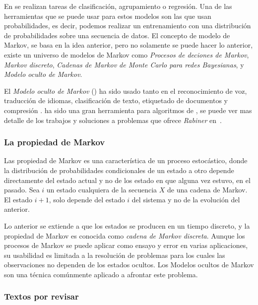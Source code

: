 
En \machinelearning se realizan tareas de clasificación, agrupamiento o regresión. Una de las herramientas que se puede usar para estos modelos son las que usan probabilidades, es decir, podemos realizar un entrenamiento con una distribución de probabilidades sobre una secuencia de datos. El concepto de modelo de Markov, se basa en la idea anterior, pero no solamente se puede hacer lo anterior, existe un universo de modelos de Markov como \emph{Procesos de deciones de Markov}, \emph{Markov discreto}, \emph{Cadenas de Markov de Monte Carlo para redes Bayesianas}, y  \emph{Modelo oculto de Markov}.

El \emph{Modelo oculto de Markov} (\HMM) ha sido usado tanto en el reconocimiento de voz, traducción de idiomas, clasificación de texto, etiquetado de documentos y compresión \MLkhanna. \HMM ha sido una gran herramienta para algoritmos de \machinelearning, se puede ver mas detalle de los trabajos y soluciones a problemas que ofrece \emph{Rabiner} en~\cite{}.





\subsubsection{La propiedad de Markov}



Las propiedad de Markov es una característica de un proceso estocástico, donde la distribución de probabilidades condicionales de un estado a otro depende directamente del estado actual y no de los estado en que alguna vez estuvo, en el pasado. Sea $i$ un estado cualquiera de la secuencia $X$ de una cadena de Markov.  El estado $i+1$, solo depende del estado $i$ del sistema y no de la evolución del anterior.


Lo anterior se extiende a que los estados se producen en un tiempo discreto, y la propiedad de Markov es conocida como \emph{cadena de Markov discreta}. Aunque los procesos de Markov se puede aplicar como ensayo y error en varias aplicaciones, su usabilidad es limitada a la resolución de problemas para los cuales las observaciones no dependen de los estados ocultos. Los Modelos ocultos de Markov son una técnica comúnmente aplicado a afrontar este problema.






\subsubsection{Textos por revisar}

